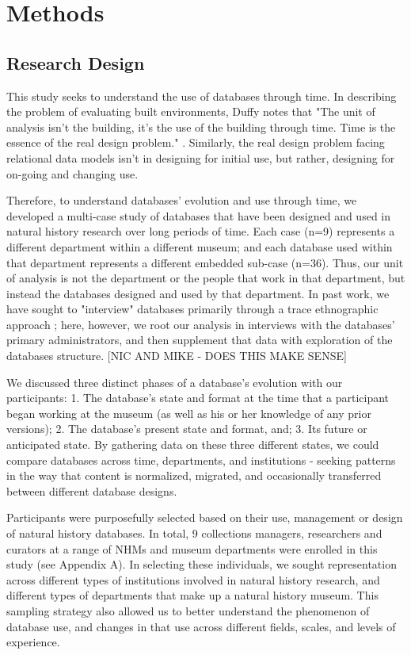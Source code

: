 \section{Methods}

\subsection{Research Design}

This study seeks to understand the use of databases through time. In describing the problem of evaluating built environments, Duffy notes that "The unit of analysis isn't the building, it's the use of the building through time. Time is the essence of the real design problem." \cite{duffy1990measuring}. Similarly, the real design problem facing relational data models isn't in designing for initial use, but rather, designing for on-going and changing use. 

Therefore, to understand databases' evolution and use through time, we developed a multi-case study of databases that have been designed and used in natural history research over long periods of time. Each case (n=9) represents a different department within a different museum; and each database used within that department represents a different embedded sub-case (n=36). Thus, our unit of analysis is not the department or the people that work in that department, but instead the databases designed and used by that department. In past work, we have sought to "interview" databases primarily through a trace ethnographic approach \cite{Geiger_2011}; here, however, we root our analysis in interviews with the databases' primary administrators, and then supplement that data with exploration of the databases structure. [NIC AND MIKE - DOES THIS MAKE SENSE]

We discussed three distinct phases of a database's evolution with our participants: 
1. The database's state and format at the time that a participant began working at the museum (as well as his or her knowledge of any prior versions); 
2. The database's present state and format, and; 
3. Its future or anticipated state. 
By gathering data on these three different states, we could  compare databases across time, departments, and institutions - seeking patterns in the way that content is normalized, migrated, and occasionally transferred between different database designs. 

Participants were purposefully selected based on their use, management or design of natural history databases. In total, 9 collections managers, researchers and curators at a range of NHMs and museum departments were enrolled in this study (see Appendix A). In selecting these individuals, we sought representation across different types of institutions involved in natural history research, and different types of departments that make up a natural history museum. This sampling strategy also allowed us to better understand the phenomenon of database use, and changes in that use across different fields, scales, and levels of experience.

